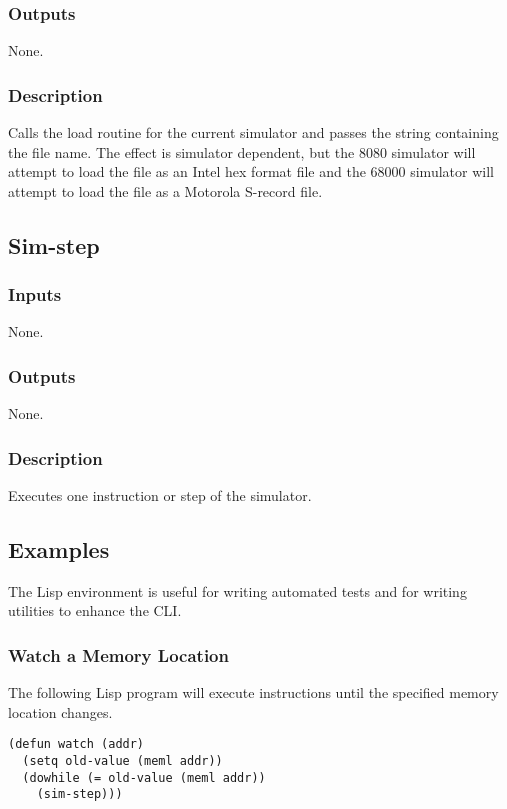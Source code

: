 \documentclass[10pt, openany]{book}
\begin{document}
\subsubsection{Outputs}
None.
\subsubsection{Description}
Calls the load routine for the current simulator and passes the string containing the file name.  The effect is simulator dependent, but the 8080 simulator will attempt to load the file as an Intel hex format file and the 68000 simulator will attempt to load the file as a Motorola S-record file.

\subsection{Sim-step}
\subsubsection{Inputs}
None.
\subsubsection{Outputs}
None.
\subsubsection{Description}
Executes one instruction or step of the simulator.

\subsection{Examples}
The Lisp environment is useful for writing automated tests and for writing utilities to enhance the CLI.
\subsubsection{Watch a Memory Location}
The following Lisp program will execute instructions until the specified memory location changes.
\lstset{language=[Tiny]Lisp}
\begin{lstlisting}
(defun watch (addr)
  (setq old-value (meml addr))
  (dowhile (= old-value (meml addr))
    (sim-step)))
\end{lstlisting}

\clearpage
{}
\nocite{m68000a}
\nocite{m68000b}
\nocite{i8080}


\end{document}

